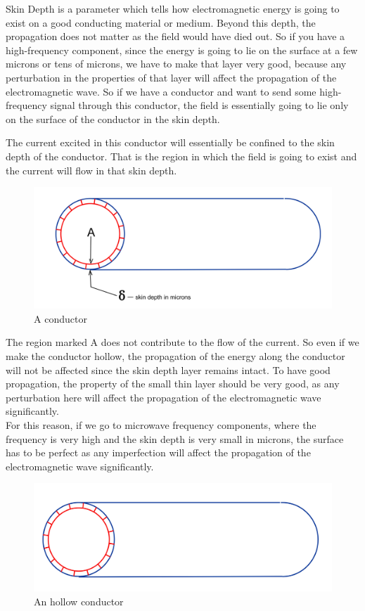 Skin Depth is a parameter which tells how electromagnetic energy is going to exist on a good conducting material or medium. Beyond this depth, the propagation does not matter as the field would have died out. So if you have a high-frequency component, since the energy is going to lie on the surface at a few microns or tens of microns, we have to make that layer very good, because any perturbation in the properties of that layer will affect the propagation of the electromagnetic wave. So if we have a conductor and want to send some high-frequency signal through this conductor, the field is essentially going to lie only on the surface of the conductor in the skin depth.

The current excited in this conductor will essentially be confined to the skin depth of the conductor. That is the region in which the field is going to exist and the current will flow in that skin depth.
\begin{figure}[h]
\centering
\includegraphics[width=1\linewidth]{./graphics/Bello262}
\caption{A conductor}
\end{figure}

The region marked A does not contribute to the flow of the current. So even if we make the conductor hollow, the propagation of the energy along the conductor will not be affected since the skin depth layer remains intact. To have good propagation, the property of the small thin layer should be very good, as any perturbation here will affect the propagation of the electromagnetic wave significantly.\\		
For this reason, if we go to microwave frequency components, where the frequency is very high and the skin depth is very small in microns, the surface has to be perfect as any imperfection will affect the propagation of the electromagnetic wave significantly.
\begin{figure}[h]
\centering
\includegraphics[scale=0.2]{./graphics/Bello263}
\caption{An hollow conductor}
\end{figure}


